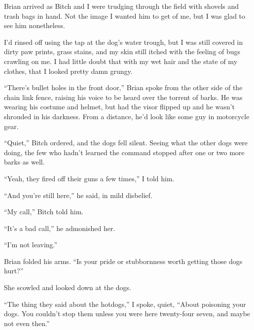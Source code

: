 





Brian arrived as Bitch and I were trudging through the field with shovels and trash bags in hand.  Not the image I wanted him to get of me, but I was glad to see him nonetheless.



I'd rinsed off using the tap at the dog's water trough, but I was still covered in dirty paw prints, grass stains, and my skin still itched with the feeling of bugs crawling on me.  I had little doubt that with my wet hair and the state of my clothes, that I looked pretty damn grungy.



``There's bullet holes in the front door,'' Brian spoke from the other side of the chain link fence, raising his voice to be heard over the torrent of barks.  He was wearing his costume and helmet, but had the visor flipped up and he wasn't shrouded in his darkness.  From a distance, he'd look like some guy in motorcycle gear.



``Quiet,'' Bitch ordered, and the dogs fell silent.  Seeing what the other dogs were doing, the few who hadn't learned the command stopped after one or two more barks as well.



``Yeah, they fired off their guns a few times,'' I told him.



``And you're still here,'' he said, in mild disbelief.



``My call,'' Bitch told him.



``It's a bad call,'' he admonished her.



``I'm not leaving.''



Brian folded his arms.  ``Is your pride or stubbornness worth getting those dogs hurt?''



She scowled and looked down at the dogs.



``The thing they said about the hotdogs,'' I spoke, quiet, ``About poisoning your dogs.  You couldn't stop them unless you were here twenty-four seven, and maybe not even then.''



